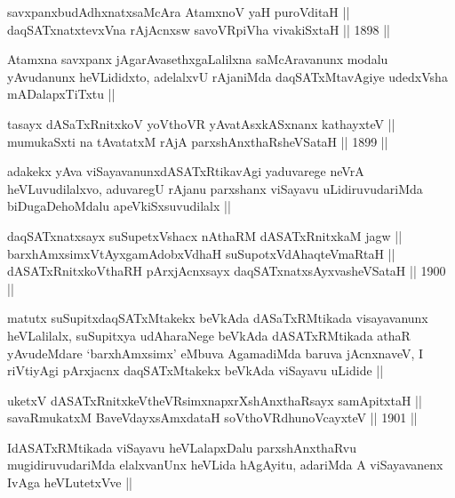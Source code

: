 
\begin{shl}
savxpanxbudAdhxnatxsaMcAra AtamxnoV yaH puroVditaH || \\
daqSATxnatxtevxVna rAjAcnx\s sw savoVR\s piVha vivakiSxtaH ||  1898 ||  
\end{shl}

\begin{artha}
Atamxna savxpanx jAgarAvasethxgaLalilxna saMcAravanunx modalu
yAvudanunx heVLididxto, adelalxvU rAjaniMda daqSATxMtavAgiye udedxVsha
mADalapxTiTxtu ||
\end{artha}


\begin{shl}
tasayx dASaTxRnitxkoV yoV\s thoVR yAvatAsxkASxnanx kathayxteV || \\
mumukaSxti na tAvatatxM rAjA parxshAnxthaRsheVSataH ||  1899 ||  
\end{shl}

\begin{artha}
adakekx yAva viSayavanunxdASATxRtikavAgi yaduvarege neVrA
heVLuvudilalxvo, aduvaregU rAjanu parxshanx viSayavu uLidiruvudariMda
biDugaDehoMdalu apeVkiSxsuvudilalx ||
\end{artha}

\begin{shl}
daqSATxnatxsayx suSupetxVshacx nAthaRM dASATxRnitxkaM jagw || \\
barxhAmxsimxVtAyxgamAdobxVdhaH suSupotxVdAhaqteVmaRtaH || \\
dASATxRnitxkoV\s thaRH pArxjAcnxsayx daqSATxnatxsAyxvasheVSataH ||  1900 ||  
\end{shl}

\begin{artha}
matutx suSupitxdaqSATxMtakekx beVkAda dASaTxRMtikada visayavanunx
heVLalilalx, suSupitxya udAharaNege beVkAda dASATxRMtikada athaR
yAvudeMdare `barxhAmxsimx' eMbuva AgamadiMda baruva jAcnxnaveV, I
riVtiyAgi pArxjacnx daqSATxMtakekx beVkAda viSayavu uLidide ||
\end{artha}

\begin{shl}
uketxV dASATxRnitxkeV\s theVR\s simxnapxrXshAnxthaRsayx samApitxtaH || \\
savaRmukatxM BaveVdayxsAmxdataH soV\s thoVR\s dhunoVcayxteV ||  1901 ||  
\end{shl}

\begin{artha}
IdASATxRMtikada viSayavu heVLalapxDalu parxshAnxthaRvu
mugidiruvudariMda elalxvanUnx heVLida hAgAyitu, adariMda A
viSayavanenx IvAga heVLutetxVve ||
\end{artha}

